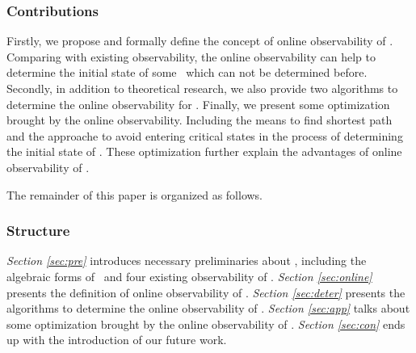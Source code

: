 

\subsubsection*{Contributions}
Firstly, we propose and formally define the concept of online observability of \BCNs. Comparing with existing observability, the online observability can help to determine the initial state of some \BCNs\ which can not be determined before. Secondly, in addition to theoretical research, we also provide two algorithms to determine the online observability for \BCNs. Finally, we present some optimization brought by the online observability. Including the means to find shortest path and the approache to avoid entering critical states in the process of determining the initial state of \BCNs.  These optimization further explain the advantages of online observability of \BCNs. %

The remainder of this paper is organized as follows.
\subsubsection*{Structure}
 {\em Section \ref{sec:pre}} introduces necessary preliminaries about \BCNs, including the algebraic forms of \BCNs\ and four existing observability of \BCNs. {\em Section \ref{sec:online}} presents the definition of online observability of \BCNs. {\em Section \ref{sec:deter}} presents the algorithms to determine the online observability of \BCNs. {\em Section \ref{sec:app}} talks about some optimization brought by the online observability of \BCNs. {\em Section \ref{sec:con}} ends up with the introduction of our future work.


